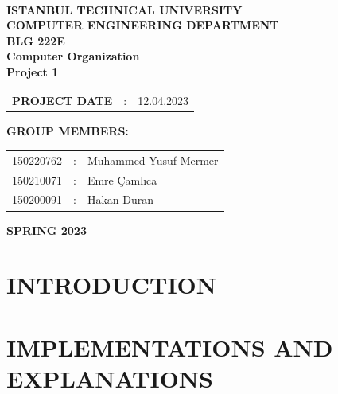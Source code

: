 \documentclass[pdftex,12pt,a4paper]{article}
\begin{document}
\begin{titlepage}
\begin{center}
\textbf{}\\
\textbf{\Large{ISTANBUL TECHNICAL UNIVERSITY}}\\
\vspace{0.5cm}
\textbf{\Large{COMPUTER ENGINEERING DEPARTMENT}}\\
\vspace{2cm}
\textbf{\Large{BLG 222E\\ Computer Organization \\ Project 1}}\\
\vspace{2.8cm}
\begin{table}[ht]
\centering
\Large{
\begin{tabular}{lcl}
\textbf{PROJECT DATE}  & : & 12.04.2023\\
\end{tabular}}
\end{table}
\vspace{1cm}
\textbf{\Large{GROUP MEMBERS:}}\\
\begin{table}[ht]
\centering
\Large{
\begin{tabular}{rcl}
150220762  & : & Muhammed Yusuf Mermer  \\
150210071  & : & Emre Çamlıca \\
150200091  & : & Hakan Duran \\
\end{tabular}}
\end{table}
\vspace{2.8cm}
\textbf{\Large{SPRING 2023}}

\end{center}

\end{titlepage}

\thispagestyle{empty}
\setcounter{tocdepth}{4}
\tableofcontents
\clearpage

\setcounter{page}{1}
\section{INTRODUCTION}


\section{IMPLEMENTATIONS AND EXPLANATIONS }
\end{document}
